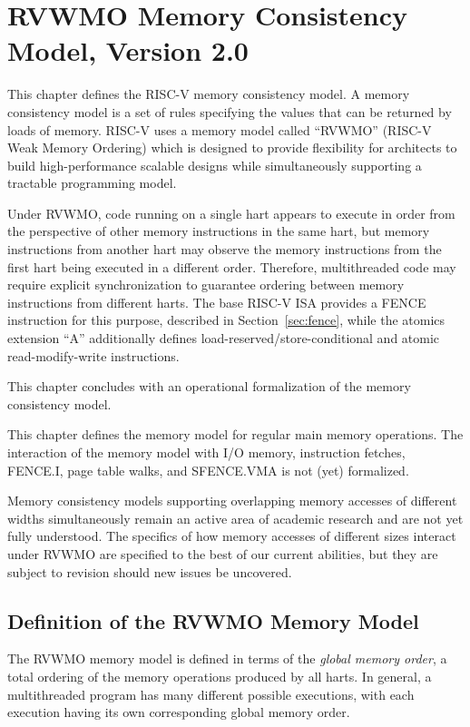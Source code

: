 \chapter{RVWMO Memory Consistency Model, Version 2.0}
\label{ch:memorymodel}

This chapter defines the RISC-V memory consistency model.
A memory consistency model is a set of rules specifying the values that can be returned by loads of memory.
RISC-V uses a memory model called ``RVWMO'' (RISC-V Weak Memory Ordering) which is designed to provide flexibility for architects to build high-performance scalable designs while simultaneously supporting a tractable programming model.

Under RVWMO, code running on a single hart appears to execute in order from the perspective of other memory instructions in the same hart, but memory instructions from another hart may observe the memory instructions from the first hart being executed in a different order.
Therefore, multithreaded code may require explicit synchronization to guarantee ordering between memory instructions from different harts.
The base RISC-V ISA provides a FENCE instruction for this purpose, described in Section~\ref{sec:fence}, while the atomics extension ``A'' additionally defines load-reserved/store-conditional and atomic read-modify-write instructions.

This chapter concludes with an operational formalization of the memory consistency model.

\begin{commentary}
  This chapter defines the memory model for regular main memory operations.  The interaction of the memory model with I/O memory, instruction fetches, FENCE.I, page table walks, and SFENCE.VMA is not (yet) formalized.

  Memory consistency models supporting overlapping memory accesses of different widths simultaneously remain an active area of academic research and are not yet fully understood.  The specifics of how memory accesses of different sizes interact under RVWMO are specified to the best of our current abilities, but they are subject to revision should new issues be uncovered.
\end{commentary}

\section{Definition of the RVWMO Memory Model}
\label{sec:rvwmo}

The RVWMO memory model is defined in terms of the {\em global memory order}, a total ordering of the memory operations produced by all harts.
In general, a multithreaded program has many different possible executions, with each execution having its own corresponding global memory order.

